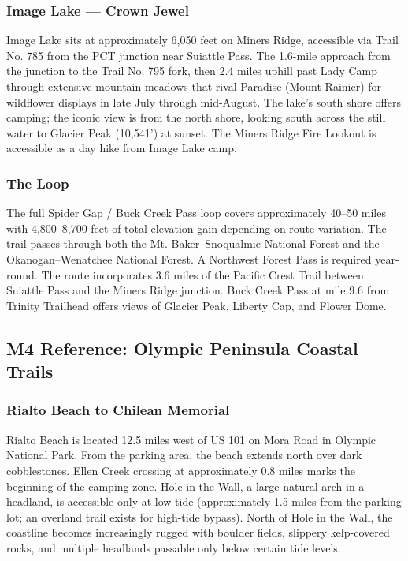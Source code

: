 \documentclass[11pt,letterpaper]{article}
\begin{document}
\subsubsection{Image Lake --- Crown Jewel}
Image Lake sits at approximately 6,050 feet on Miners Ridge, accessible via Trail No. 785 from the PCT junction near Suiattle Pass. The 1.6-mile approach from the junction to the Trail No. 795 fork, then 2.4 miles uphill past Lady Camp through extensive mountain meadows that rival Paradise (Mount Rainier) for wildflower displays in late July through mid-August. The lake's south shore offers camping; the iconic view is from the north shore, looking south across the still water to Glacier Peak (10,541') at sunset. The Miners Ridge Fire Lookout is accessible as a day hike from Image Lake camp.

\subsubsection{The Loop}
The full Spider Gap / Buck Creek Pass loop covers approximately 40--50 miles with 4,800--8,700 feet of total elevation gain depending on route variation. The trail passes through both the Mt. Baker--Snoqualmie National Forest and the Okanogan--Wenatchee National Forest. A Northwest Forest Pass is required year-round. The route incorporates 3.6 miles of the Pacific Crest Trail between Suiattle Pass and the Miners Ridge junction. Buck Creek Pass at mile 9.6 from Trinity Trailhead offers views of Glacier Peak, Liberty Cap, and Flower Dome.

\subsection{M4 Reference: Olympic Peninsula Coastal Trails}

\subsubsection{Rialto Beach to Chilean Memorial}
Rialto Beach is located 12.5 miles west of US 101 on Mora Road in Olympic National Park. From the parking area, the beach extends north over dark cobblestones. Ellen Creek crossing at approximately 0.8 miles marks the beginning of the camping zone. Hole in the Wall, a large natural arch in a headland, is accessible only at low tide (approximately 1.5 miles from the parking lot; an overland trail exists for high-tide bypass). North of Hole in the Wall, the coastline becomes increasingly rugged with boulder fields, slippery kelp-covered rocks, and multiple headlands passable only below certain tide levels.
\end{document}
